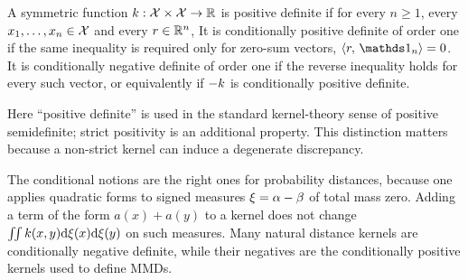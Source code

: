 \begin{defn}\label{def-positive-kernels}
	A symmetric function $k:\mathcal{X}\times\mathcal{X}\to\mathbb{R}$ is positive definite if for every $n\geq1$, every $x_1,\ldots,x_n\in\mathcal{X}$ and every $r\in\mathbb{R}^n$,
	It is conditionally positive definite of order one if the same inequality is required only for zero-sum vectors, $\dotp{r}{\ones_n}=0$. It is conditionally negative definite of order one if the reverse inequality holds for every such vector, or equivalently if $-k$ is conditionally positive definite.
\end{defn}
Here ``positive definite'' is used in the standard kernel-theory sense of positive semidefinite; strict positivity is an additional property. This distinction matters because a non-strict kernel can induce a degenerate discrepancy.

The conditional notions are the right ones for probability distances, because one applies quadratic forms to signed measures $\xi=\alpha-\beta$ of total mass zero. Adding a term of the form $a(x)+a(y)$ to a kernel does not change $\iint k(x,y)\mathrm{d}\xi(x)\mathrm{d}\xi(y)$ on such measures. Many natural distance kernels are conditionally negative definite, while their negatives are the conditionally positive kernels used to define MMDs.


